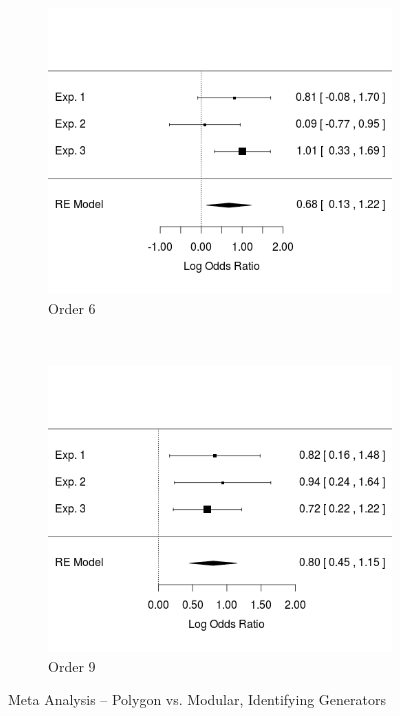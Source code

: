 \documentclass[11pt]{article}
\begin{document}
\begin{figure}[H]
\centering
\begin{subfigure}[c]{0.4\textwidth}
\centering
\includegraphics[width=\textwidth]{figures/meta/p_gen_T_6.png}
\caption{Order 6}
\end{subfigure}
~
\begin{subfigure}[c]{0.4\textwidth}
\centering
\includegraphics[width=\textwidth]{figures/meta/p_gen_T_9.png}
\caption{Order 9}
\end{subfigure}
\caption{Meta Analysis -- Polygon vs. Modular, Identifying Generators}
\label{meta_genT_p}
\end{figure}\noindent 
\end{document}
